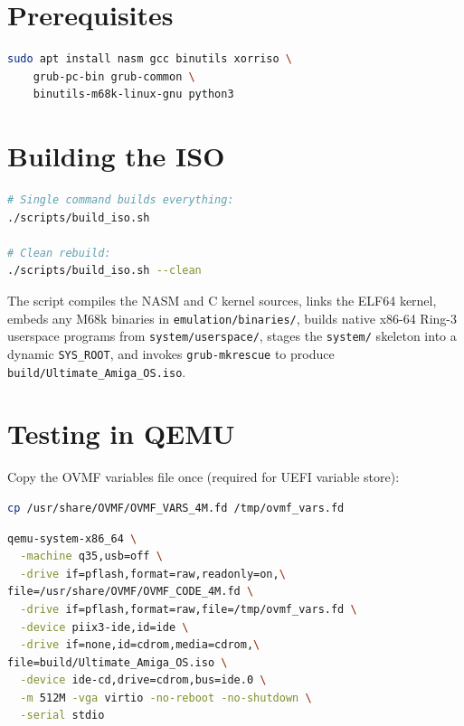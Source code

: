 \documentclass[11pt,a4paper]{report}
\begin{document}
\section{Prerequisites}

\begin{lstlisting}[language=bash, caption={Install build dependencies (Ubuntu/Debian)}]
sudo apt install nasm gcc binutils xorriso \
    grub-pc-bin grub-common \
    binutils-m68k-linux-gnu python3
\end{lstlisting}

\section{Building the ISO}

\begin{lstlisting}[language=bash, caption={Full build pipeline}]
# Single command builds everything:
./scripts/build_iso.sh

# Clean rebuild:
./scripts/build_iso.sh --clean
\end{lstlisting}

The script compiles the NASM and C kernel sources, links the ELF64 kernel,
embeds any M68k binaries in \texttt{emulation/binaries/}, builds native x86-64
Ring-3 userspace programs from \texttt{system/userspace/}, stages the
\texttt{system/} skeleton into a dynamic \texttt{SYS\_ROOT}, and invokes
\texttt{grub-mkrescue} to produce \texttt{build/Ultimate\_Amiga\_OS.iso}.

\section{Testing in QEMU}

Copy the OVMF variables file once (required for UEFI variable store):

\begin{lstlisting}[language=bash, caption={One-time OVMF setup}]
cp /usr/share/OVMF/OVMF_VARS_4M.fd /tmp/ovmf_vars.fd
\end{lstlisting}

\begin{lstlisting}[language=bash, caption={QEMU test invocation}]
qemu-system-x86_64 \
  -machine q35,usb=off \
  -drive if=pflash,format=raw,readonly=on,\
file=/usr/share/OVMF/OVMF_CODE_4M.fd \
  -drive if=pflash,format=raw,file=/tmp/ovmf_vars.fd \
  -device piix3-ide,id=ide \
  -drive if=none,id=cdrom,media=cdrom,\
file=build/Ultimate_Amiga_OS.iso \
  -device ide-cd,drive=cdrom,bus=ide.0 \
  -m 512M -vga virtio -no-reboot -no-shutdown \
  -serial stdio
\end{lstlisting}
\end{document}
